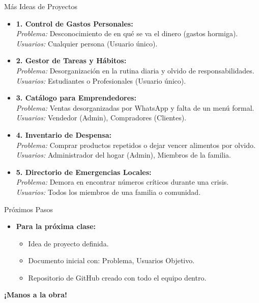 \documentclass{beamer}
\begin{document}
\begin{frame}{Más Ideas de Proyectos}
    \begin{small}
    \begin{itemize}
        \item \textbf{1. Control de Gastos Personales:} \\ \textit{Problema:} Desconocimiento de en qué se va el dinero (gastos hormiga). \\ \textit{Usuarios:} Cualquier persona (Usuario único).
        \item \textbf{2. Gestor de Tareas y Hábitos:} \\ \textit{Problema:} Desorganización en la rutina diaria y olvido de responsabilidades. \\ \textit{Usuarios:} Estudiantes o Profesionales (Usuario único).
        \item \textbf{3. Catálogo para Emprendedores:} \\ \textit{Problema:} Ventas desorganizadas por WhatsApp y falta de un menú formal. \\ \textit{Usuarios:} Vendedor (Admin), Compradores (Clientes).
        \item \textbf{4. Inventario de Despensa:} \\ \textit{Problema:} Comprar productos repetidos o dejar vencer alimentos por olvido. \\ \textit{Usuarios:} Administrador del hogar (Admin), Miembros de la familia.
        \item \textbf{5. Directorio de Emergencias Locales:} \\ \textit{Problema:} Demora en encontrar números críticos durante una crisis. \\ \textit{Usuarios:} Todos los miembros de una familia o comunidad.
    \end{itemize}
    \end{small}
\end{frame}

\begin{frame}{Próximos Pasos}
    \begin{itemize}
        \item \textbf{Para la próxima clase:}
        \begin{itemize}
            \item Idea de proyecto definida.
            \item Documento inicial con: Problema, Usuarios Objetivo.
            \item Repositorio de GitHub creado con todo el equipo dentro.
        \end{itemize}
    \end{itemize}
    \vspace{1cm}
    \begin{center}
        \Large \textbf{¡Manos a la obra!}
    \end{center}
\end{frame}
\end{document}
